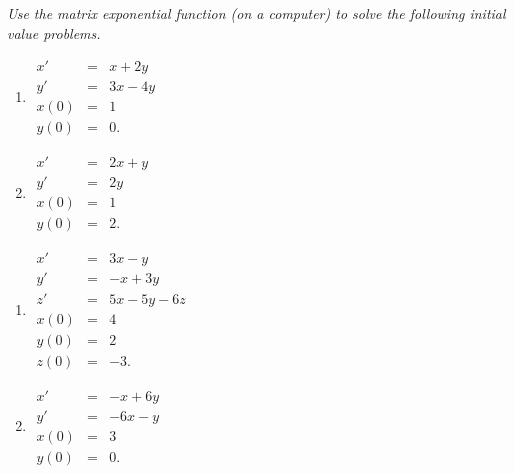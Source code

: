 \documentclass[10pt]{article}
\begin{document}
\noindent
\textit{Use the matrix exponential function (on a computer) to solve the following initial value problems.}

\begin{multicols}{2}
\begin{enumerate}
\setcounter{enumi}{\theenumCount}

\item $\begin{array}{ccl} x' & = & x + 2y \\ y' & = & 3x - 4y \\ x(0) & = & 1 \\ y(0) & = & 0.\end{array}$ 

\item $\begin{array}{ccl} x' & = & 2x + y \\ y' & = & 2y \\ x(0) & = & 1 \\ y(0) & = & 2.\end{array}$ 

\setcounter{enumCount}{\theenumi}
\end{enumerate} 
\end{multicols}
\vfill


\begin{multicols}{2}
\begin{enumerate}
\setcounter{enumi}{\theenumCount}

\item $\begin{array}{ccl} x' & = & 3x - y  \\ y' & = & -x + 3y  \\ z' & = & 5x - 5y - 6z \\ x(0) & = & 4 \\  y(0) & = & 2 \\ z(0) & = & -3. \end{array}$ \\  
\item $\begin{array}{ccl} x' & = & -x + 6y \\ y' & = & -6x - y \\ x(0) & = & 3 \\ y(0) & = & 0.\end{array}$ 

\setcounter{enumCount}{\theenumi}
\end{enumerate} 
\end{multicols}
\vfill
\end{document}
